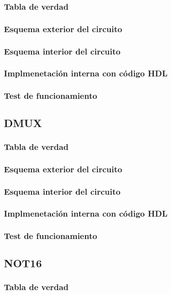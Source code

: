 \documentclass[12pt]{article}
\begin{document}
        \subsubsection{Tabla de verdad}
        \subsubsection{Esquema exterior del circuito}
        \subsubsection{Esquema interior del circuito}
        \subsubsection{Implmenetación interna con código HDL}
        \subsubsection{Test de funcionamiento}
    \newpage
    \subsection{DMUX}
        \subsubsection{Tabla de verdad}
        \subsubsection{Esquema exterior del circuito}
        \subsubsection{Esquema interior del circuito}
        \subsubsection{Implmenetación interna con código HDL}
        \subsubsection{Test de funcionamiento}
    \newpage
    \subsection{NOT16}
        \subsubsection{Tabla de verdad}
\end{document}
